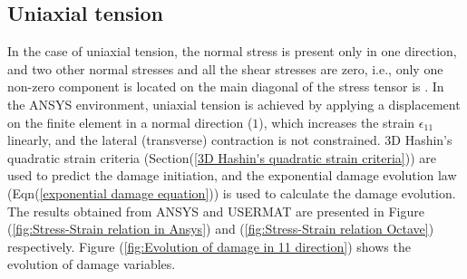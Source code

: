 \documentclass[12pt]{report}
\begin{document}
\subsection{Uniaxial tension}
\indent\indent\indent In the case of uniaxial tension, the normal stress is present only in one direction, and two other normal stresses and all the shear stresses are zero, i.e., only one non-zero component is located on the main diagonal of the stress tensor is .  In the ANSYS environment, uniaxial tension is achieved by applying a displacement on the finite element in a normal direction ($1$), which increases the strain $\epsilon_{11}$ linearly, and the lateral (transverse) contraction is not constrained. 3D Hashin's quadratic strain criteria (Section(\ref{3D Hashin's quadratic strain criteria})) are used to predict the damage initiation, and the exponential damage evolution law (Eqn(\ref{exponential damage equation})) is used to calculate the damage evolution. The results obtained from ANSYS and USERMAT are presented in Figure (\ref{fig:Stress-Strain relation in Ansys}) and (\ref{fig:Stress-Strain relation Octave}) respectively. Figure (\ref{fig:Evolution of damage in 11 direction}) shows the evolution of damage variables.\\ 
\end{document}
